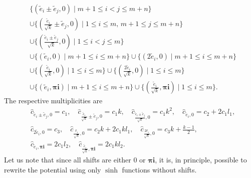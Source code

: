 \documentclass[12pt]{amsart}
\numberwithin{equation}{section}
\theoremstyle{definition}
\begin{document}
\begin{align*}
    &\{ (\widetilde{e}_i \pm \widetilde{e}_j, 0) \mid m + 1 \leq i < j \leq m+n \} \\ &\cup \{ (\tfrac{\widetilde{e}_i}{\sqrt{k}} \pm \widetilde{e}_j , 0) \mid 1 \leq i \leq m, \, m+1 \leq j \leq m+n \} \\ &\cup \{ (\tfrac{\widetilde{e}_i \pm \widetilde{e}_j}{\sqrt{k}} , 0) \mid 1 \leq i < j \leq m\}  \\ &\cup \{(\widetilde{e}_i ,0 ) \mid m+1 \leq i \leq m+n \}  \cup \{ (2\widetilde{e}_i , 0) \mid m+1 \leq i \leq m+n \} \\  &\cup \{ (\tfrac{\widetilde{e}_i}{\sqrt{k}} , 0) \mid 1 \leq i \leq m \} \cup \{ (\tfrac{2\widetilde{e}_i}{\sqrt{k}},0) \mid 1 \leq i \leq m \} \\
    &\cup \{ (\widetilde{e}_i,  \boldsymbol{\pi} \boldsymbol{i}) \mid m+1 \leq i \leq m+n  \} \cup \{ (\tfrac{\widetilde{e}_i}{\sqrt{k}},  \boldsymbol{\pi} \boldsymbol{i}) \mid 1 \leq i \leq m \}. 
\end{align*}
 The respective multiplicities are
\begin{align*}
    &\widehat{c}_{\widetilde{e}_i \pm \widetilde{e}_j, 0} = c_1, \quad \widehat{c}_{\tfrac{\widetilde{e}_i}{\sqrt{k}} \pm \widetilde{e}_j , 0} = c_1 k, \quad \widehat{c}_{\tfrac{\widetilde{e}_i \pm \widetilde{e}_j}{\sqrt{k}} , 0} = c_1 k^2,  \quad
    \widehat{c}_{\widetilde{e}_i, 0} = c_2 +2 c_1 l_1, \\
    &\widehat{c}_{2\widetilde{e}_i, 0} = c_3, \quad 
    \widehat{c}_{\tfrac{\widehat{e}_i}{\sqrt{k}}, 0} = c_2 k + 2 c_1 k l_1, \quad
    \widehat{c}_{\tfrac{2\widehat{e}_i}{\sqrt{k}}, 0} = c_3 k + \frac{k-1}{2}, \\
    &\widehat{c}_{\widetilde{e}_i, \boldsymbol{\pi} \boldsymbol{i}} = 2 c_1l_2, \quad
    \widehat{c}_{\tfrac{\widetilde{e}_i}{\sqrt{k}},  \boldsymbol{\pi} \boldsymbol{i}} = 2 c_1 kl_2.
\end{align*}
Let us note that since all shifts are either 0 or $ \boldsymbol{\pi} \boldsymbol{i}$, it is, in principle, possible to rewrite the potential using only $\sinh$ functions without shifts.
\end{document}
